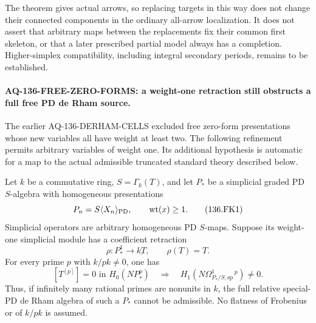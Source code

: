 The theorem gives actual arrows, so replacing targets in
this way does not change their connected components in the
ordinary all-arrow localization. It does not assert that
arbitrary maps between the replacements fix their common
first skeleton, or that a later prescribed partial model
always has a completion. Higher-simplex compatibility,
including integral secondary periods, remains to be established.


\paragraph{AQ-136-FREE-ZERO-FORMS: a weight-one retraction still obstructs a full free PD de Rham source.}
The earlier AQ-136-DERHAM-CELLS excluded free zero-form
presentations whose new variables all have weight at least two.
The following refinement permits arbitrary variables of weight
one. Its additional hypothesis is automatic for a map to the
actual admissible truncated standard theory described below.

Let $k$ be a commutative ring, $S=\Gamma_k(T)$, and let $P_*$
be a simplicial graded PD $S$-algebra with homogeneous
presentations
\[
                  P_n=S\langle X_n\rangle_{\rm PD},
                \qquad \operatorname{wt}(x)\ge1.
                                                               \tag{136.FK1}
\]
Simplicial operators are arbitrary homogeneous PD $S$-maps.
Suppose its weight-one simplicial module has a coefficient
retraction
\[
          \rho:P_*^1\longrightarrow\underline{kT},
                            \qquad \rho(T)=T.              \tag{136.FK2}
\]
For every prime $p$ with $k/pk\ne0$, one has
\[
 [T^{[p]}]=0\text{ in }H_0(NP_*^p)
       \quad\Longrightarrow\quad
 H_1\!\left(N\Omega^1_{P_*/S,\mathrm{sp}}{}^{\,p}\right)\ne0.
                                                               \tag{136.FK3}
\]
Thus, if infinitely many rational primes are nonunits in $k$,
the full relative special-PD de Rham algebra of such a $P_*$
cannot be admissible. No flatness of Frobenius or of $k/pk$
is assumed.

